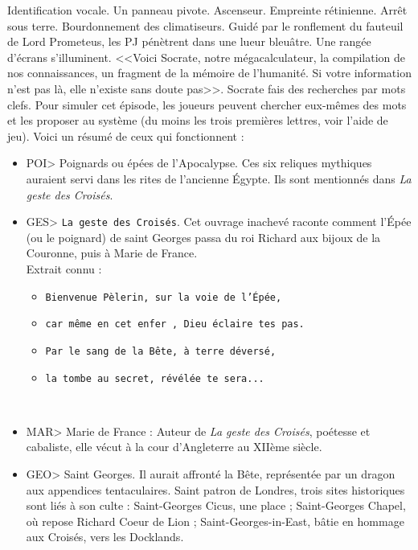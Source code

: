 \documentclass[11pt,twoside,a4paper]{book}
\begin{document}
Identification vocale. Un panneau pivote. Ascenseur. Empreinte r{\'e}tinienne. Arr{\^e}t sous terre. Bourdonnement des climatiseurs. Guid{\'e} par le ronflement du fauteuil de Lord Prometeus, les PJ p{\'e}n{\`e}trent dans une lueur bleu{\^a}tre. Une rang{\'e}e d'{\'e}crans s'illuminent. <<Voici Socrate, notre m{\'e}gacalculateur, la compilation de nos connaissances, un fragment de la m{\'e}moire de l'humanit{\'e}. Si votre information n'est pas l{\`a}, elle n'existe sans doute pas>>. Socrate fais des recherches par mots clefs. Pour simuler cet {\'e}pisode, les joueurs peuvent chercher eux-m{\^e}mes des mots et les proposer au syst{\`e}me (du moins les trois premi{\`e}res lettres, voir l'aide de jeu). Voici un r{\'e}sum{\'e} de ceux qui fonctionnent :
\setlength\parindent{20pt}
\begin{itemize}
	\item POI> Poignards ou {\'e}p{\'e}es de l'Apocalypse. Ces six reliques mythiques auraient servi dans les rites de l'ancienne {\'E}gypte. Ils sont mentionn{\'e}s dans \emph{La geste des Crois{\'e}s}.
	\item GES> \texttt{La geste des Crois{\'e}s}. Cet ouvrage inachev{\'e} raconte comment l'{\'E}p{\'e}e (ou le poignard) de saint Georges passa du roi Richard aux bijoux de la Couronne, puis {\`a} Marie de France.~\\
		Extrait connu :~\\
		\begin{itemize}
			\item[] \texttt{Bienvenue P{\`e}lerin, sur la voie de l'{\'E}p{\'e}e, }
			\item[] \texttt{car m{\^e}me en cet enfer , Dieu {\'e}claire tes pas. }
			\item[] \texttt{Par le sang de la B{\^e}te, {\`a} terre d{\'e}vers{\'e}, }
			\item[] \texttt{la tombe au secret, r{\'e}v{\'e}l{\'e}e te sera... }
		\end{itemize}~\\
	\item MAR> Marie de France : Auteur de \emph{La geste des Crois{\'e}s}, po{\'e}tesse et cabaliste, elle v{\'e}cut {\`a} la cour d'Angleterre au XII{\`e}me si{\`e}cle.
	\item GEO> Saint Georges. Il aurait affront{\'e} la B{\^e}te, repr{\'e}sent{\'e}e par un dragon aux appendices tentaculaires. Saint patron de Londres, trois sites historiques sont li{\'e}s {\`a} son culte : Saint-Georges Cicus, une place ; Saint-Georges Chapel, o{\`u} repose Richard Coeur de Lion ; Saint-Georges-in-East, b{\^a}tie en hommage aux Crois{\'e}s, vers les Docklands.
\end{itemize}%
\setlength\parindent{0pt}
\end{document}
